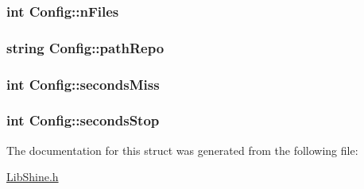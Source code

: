 \hypertarget{structConfig_a4a5c2783f6aa2283fb3343082bff5ef7}{
\subsubsection[{n\-Files}]{\setlength{\rightskip}{0pt plus 5cm}int Config\-::n\-Files}}\label{structConfig_a4a5c2783f6aa2283fb3343082bff5ef7}
\hypertarget{structConfig_a0a3293605217709540e386fb81eca8bb}{
\subsubsection[{path\-Repo}]{\setlength{\rightskip}{0pt plus 5cm}string Config\-::path\-Repo}}\label{structConfig_a0a3293605217709540e386fb81eca8bb}
\hypertarget{structConfig_a67a01273e506bff5e53b32b9dc3f055f}{
\subsubsection[{seconds\-Miss}]{\setlength{\rightskip}{0pt plus 5cm}int Config\-::seconds\-Miss}}\label{structConfig_a67a01273e506bff5e53b32b9dc3f055f}
\hypertarget{structConfig_aba7ec96be1c28ec01e67f7ae5acd45b4}{
\subsubsection[{seconds\-Stop}]{\setlength{\rightskip}{0pt plus 5cm}int Config\-::seconds\-Stop}}\label{structConfig_aba7ec96be1c28ec01e67f7ae5acd45b4}


The documentation for this struct was generated from the following file\-:\begin{DoxyCompactItemize}
\item 
\hyperlink{LibShine_8h}{Lib\-Shine.\-h}\end{DoxyCompactItemize}
